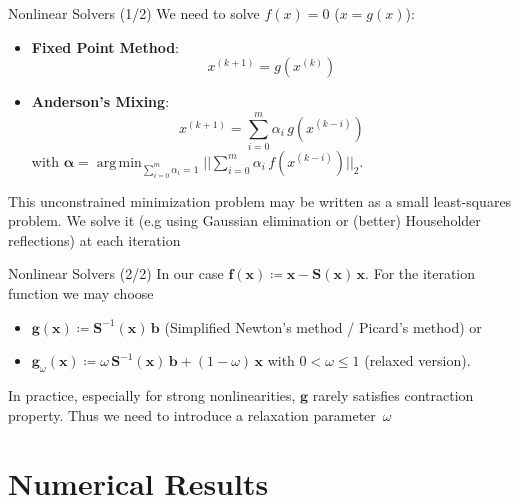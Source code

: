 \documentclass{beamer}
\DeclareMathOperator{\argmin}{arg\,min}
\newcommand{\vect}[1]{\boldsymbol{\mathbf{#1}}}
\begin{document}
	\begin{frame}{Nonlinear Solvers (1/2)}
		We need to solve $f(x) = 0$ ($x = g(x)$):
		\vfill
		\begin{itemize}
			\item \textbf{Fixed Point Method}: 
			$$
				x^{(k+1)} = g(x^{(k)})
			$$
			\item \textbf{Anderson’s Mixing}: 
			$$
				x^{(k+1)} = \sum_{i=0}^m \alpha_i\,g(x^{(k-i)})
			$$
			with $\vect\alpha = \argmin_{\sum_{i=0}^m \alpha_i = 1} || \sum_{i=0}^m \alpha_i\,f(x^{(k-i)}) ||_2$. 
		\end{itemize}
		\vfill
		This unconstrained minimization problem may be written as a small least-squares problem. We solve it (e.g using Gaussian elimination or (better) Householder reflections) at each iteration  
	\end{frame}

	\begin{frame}{Nonlinear Solvers (2/2)}
		In our case $\vect f(\vect x) \coloneqq \vect x - \vect S(\vect x)\,\vect x$. For the iteration function we may choose
		\begin{itemize}
			\item $\vect g(\vect x) \coloneqq \vect S^{-1}(\vect x)\,\vect b$ (Simplified Newton’s method / Picard’s method) or
			\item $\vect g_\omega(\vect x) \coloneqq \omega\,\vect S^{-1}(\vect x)\,\vect b + (1 - \omega)\,\vect x$ with $0 < \omega \le 1$ (relaxed version).
		\end{itemize}
		In practice, especially for strong nonlinearities, $\vect g$ rarely satisfies contraction property. Thus we need to introduce a relaxation parameter~$\omega$ 
	\end{frame}
	
	\section{Numerical Results}
	
\end{document}
